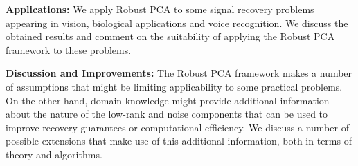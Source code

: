 \documentclass{../../common/projectreport}
\begin{document}
\textbf{Applications:}
We apply Robust PCA to some signal recovery problems appearing in vision, biological applications and voice recognition. We discuss the obtained results and comment on the suitability of applying the Robust PCA framework to these problems.


\textbf{Discussion and Improvements:}
The Robust PCA framework makes a number of assumptions that might be limiting applicability to some practical problems. On the other hand, domain knowledge might provide additional information about the nature of the low-rank and noise components that can be used to improve recovery guarantees or computational efficiency. We discuss a number of possible extensions that make use of this additional information, both in terms of theory and algorithms.


\end{document}
